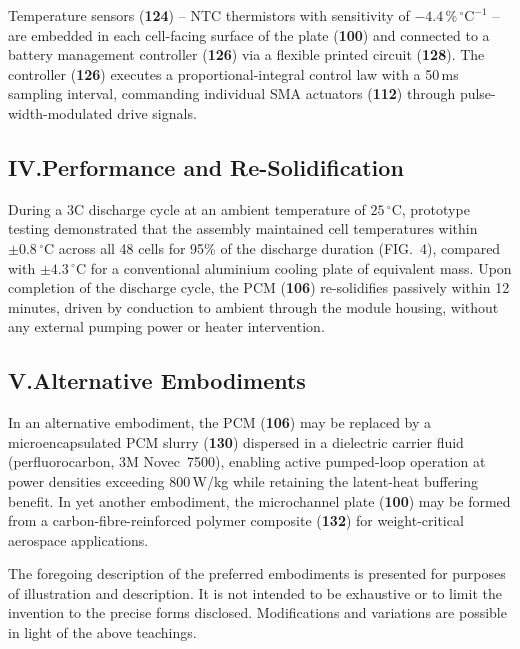 \documentclass[12pt,letterpaper]{article}
\begin{document}
Temperature sensors (\textbf{124}) -- NTC thermistors with sensitivity of
$-4.4\,\%\,^{\circ}\mathrm{C}^{-1}$ -- are embedded in each cell-facing surface of the plate
(\textbf{100}) and connected to a battery management controller (\textbf{126}) via a
flexible printed circuit (\textbf{128}). The controller (\textbf{126}) executes a
proportional-integral control law with a 50\,ms sampling interval, commanding individual
SMA actuators (\textbf{112}) through pulse-width-modulated drive signals.

\subsection*{IV.\quad Performance and Re-Solidification}

During a 3C discharge cycle at an ambient temperature of $25\,^{\circ}$C, prototype testing
demonstrated that the assembly maintained cell temperatures within
$\pm 0.8\,^{\circ}$C across all 48 cells for 95\% of the discharge duration (FIG.~4),
compared with $\pm 4.3\,^{\circ}$C for a conventional aluminium cooling plate of equivalent
mass. Upon completion of the discharge cycle, the PCM (\textbf{106}) re-solidifies
passively within 12 minutes, driven by conduction to ambient through the module housing,
without any external pumping power or heater intervention.

\subsection*{V.\quad Alternative Embodiments}

In an alternative embodiment, the PCM (\textbf{106}) may be replaced by a microencapsulated
PCM slurry (\textbf{130}) dispersed in a dielectric carrier fluid (perfluorocarbon, 3M
Novec\texttrademark~7500), enabling active pumped-loop operation at power densities
exceeding 800\,W/kg while retaining the latent-heat buffering benefit. In yet another
embodiment, the microchannel plate (\textbf{100}) may be formed from a carbon-fibre-reinforced
polymer composite (\textbf{132}) for weight-critical aerospace applications.

The foregoing description of the preferred embodiments is presented for purposes of
illustration and description. It is not intended to be exhaustive or to limit the invention to
the precise forms disclosed. Modifications and variations are possible in light of the above
teachings.

\end{document}
